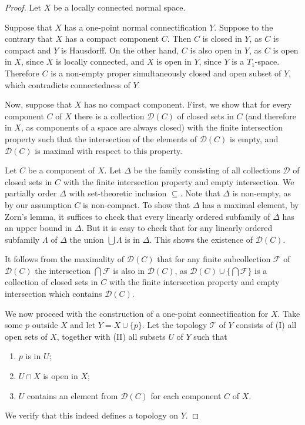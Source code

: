 \documentclass{amsart}
\newenvironment{proof of claim}{\noindent\textbf{Proof of the claim.}}{\hfill{$\square$}\newline}
\theoremstyle{definition}
\theoremstyle{remark}
\numberwithin{equation}{section}
\begin{document}
\begin{proof}
Let $X$ be a locally connected normal space.

Suppose that $X$ has a one-point normal connectification $Y$. Suppose to the contrary that $X$ has a compact component $C$. Then $C$ is closed in $Y$, as $C$ is compact and $Y$ is Hausdorff. On the other hand, $C$ is also open in $Y$, as $C$ is open in $X$, since $X$ is locally connected, and $X$ is open in $Y$, since $Y$ is a $T_1$-space. Therefore $C$ is a non-empty proper simultaneously closed and open subset of $Y$, which contradicts connectedness of $Y$.

Now, suppose that $X$ has no compact component. First, we show that for every component $C$ of $X$ there is a collection $\mathscr{D}(C)$ of closed sets in $C$ (and therefore in $X$, as components of a space are always closed) with the finite intersection property such that the intersection of the elements of $\mathscr{D}(C)$ is empty, and $\mathscr{D}(C)$ is maximal with respect to this property.

Let $C$ be a component of $X$. Let $\Delta$ be the family consisting of all collections $\mathscr{D}$ of closed sets in $C$ with the finite intersection property and empty intersection. We partially order $\Delta$ with set-theoretic inclusion $\subseteq$. Note that $\Delta$ is non-empty, as by our assumption $C$ is non-compact. To show that $\Delta$ has a maximal element, by Zorn's lemma, it suffices to check that every linearly ordered subfamily of $\Delta$ has an upper bound in $\Delta$. But it is easy to check that for any linearly ordered subfamily $\Lambda$ of $\Delta$ the union $\bigcup\Lambda$ is in $\Delta$. This shows the existence of $\mathscr{D}(C)$.

It follows from the maximality of $\mathscr{D}(C)$ that for any finite subcollection $\mathscr{F}$ of $\mathscr{D}(C)$ the intersection $\bigcap\mathscr{F}$ is also in $\mathscr{D}(C)$, as $\mathscr{D}(C)\cup\{\bigcap\mathscr{F}\}$ is a collection of closed sets in $C$ with the finite intersection property and empty intersection which contains $\mathscr{D}(C)$.

We now proceed with the construction of a one-point connectification for $X$. Take some $p$ outside $X$ and let $Y=X\cup\{p\}$. Let the topology $\mathscr{T}$ of $Y$ consists of (I) all open sets of $X$, together with (II) all subsets $U$ of $Y$ such that
\begin{enumerate}
  \item $p$ is in $U$;
  \item $U\cap X$ is open in $X$;
  \item $U$ contains an element from $\mathscr{D}(C)$ for each component $C$ of $X$.
\end{enumerate}
We verify that this indeed defines a topology on $Y$.


\end{proof}
\end{document}
